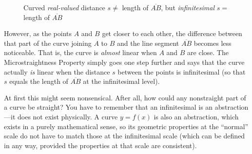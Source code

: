 \begin{figure}[ht]
\centering
{}\vspace{-12mm}
\caption[]{\quad Curved \emph{real-valued} distance $s \ne$ length of
$\overline{AB}$, but \emph{infinitesimal} $s =$ length of $\overline{AB}$}
\label{fig:curvesegments}
\end{figure}

However, as the points $A$ and $B$ get closer to each other, the difference
between that part of the curve joining $A$ to $B$ and the line segment
$\overline{AB}$ becomes less noticeable. That is, the curve is \emph{almost}
linear when $A$ and $B$ are close. The Microstraightness Property simply goes
one step further and says that the curve actually \emph{is} linear when the
distance $s$ between the points is infinitesimal (so that $s$ equals the length
of $\overline{AB}$ at the infinitesimal level).

At first this might seem nonsensical. After all, how could any nonstraight part
of a curve be straight? You have to remember that an infinitesimal is
an abstraction---it does not exist physically. A curve $y=f(x)$ is also an
abstraction, which exists in a purely mathematical sense, so its geometric
properties at the ``normal'' scale do not have to match those at the
infinitesimal scale (which can be defined in any way, provided the properties
at that scale are consistent).

